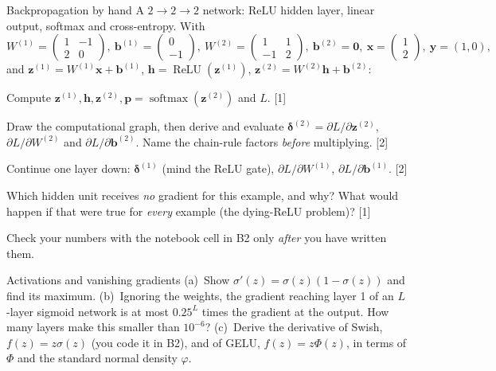 \documentclass[11pt,a4paper]{article}
\begin{document}
\begin{problem}[6 pts]{Backpropagation by hand}
A $2\to2\to2$ network: ReLU hidden layer, linear output, softmax and cross-entropy. With
\[
W^{(1)}=\begin{pmatrix}1&-1\\2&0\end{pmatrix},\ \mathbf b^{(1)}=\begin{pmatrix}0\\-1\end{pmatrix},\
W^{(2)}=\begin{pmatrix}1&1\\-1&2\end{pmatrix},\ \mathbf b^{(2)}=\mathbf 0,\
\mathbf x=\begin{pmatrix}1\\2\end{pmatrix},\ \mathbf y=(1,0),
\]
and $\mathbf z^{(1)}=W^{(1)}\mathbf x+\mathbf b^{(1)}$, $\mathbf h=\operatorname{ReLU}(\mathbf z^{(1)})$, $\mathbf z^{(2)}=W^{(2)}\mathbf h+\mathbf b^{(2)}$:
\begin{parts}
  \item Compute $\mathbf z^{(1)},\mathbf h,\mathbf z^{(2)},\mathbf p=\operatorname{softmax}(\mathbf z^{(2)})$ and $L$. \hfill [1]
  \item Draw the computational graph, then derive and evaluate $\boldsymbol\delta^{(2)}=\partial L/\partial\mathbf z^{(2)}$, $\partial L/\partial W^{(2)}$ and $\partial L/\partial\mathbf b^{(2)}$. Name the chain-rule factors \emph{before} multiplying. \hfill [2]
  \item Continue one layer down: $\boldsymbol\delta^{(1)}$ (mind the ReLU gate), $\partial L/\partial W^{(1)}$, $\partial L/\partial\mathbf b^{(1)}$. \hfill [2]
  \item Which hidden unit receives \emph{no} gradient for this example, and why? What would happen if that were true for \emph{every} example (the dying-ReLU problem)? \hfill [1]
\end{parts}
Check your numbers with the notebook cell in B2 only \emph{after} you have written them.
\end{problem}

\begin{problem}[4 pts]{Activations and vanishing gradients}
(a)~Show $\sigma'(z)=\sigma(z)(1-\sigma(z))$ and find its maximum. (b)~Ignoring the weights, the gradient reaching layer 1 of an $L$-layer sigmoid network is at most $0.25^{L}$ times the gradient at the output.
How many layers make this smaller than $10^{-6}$? (c)~Derive the derivative of Swish, $f(z)=z\sigma(z)$ (you code it in B2), and of GELU, $f(z)=z\Phi(z)$, in terms of $\Phi$ and the standard normal density $\varphi$.
\end{problem}
\end{document}

